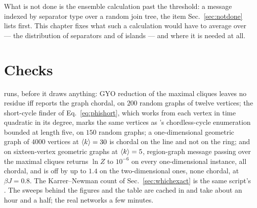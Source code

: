 What is not done is the ensemble calculation past the threshold: a message
indexed by separator type over a random join tree, the item
Sec.~\ref{sec:notdone} lists first. This chapter fixes what such a
calculation would have to average over --- the distribution of separators
and of islands --- and where it is needed at all.

\section{Checks}
\label{sec:exactness-checks}

 runs, before it draws
anything: GYO reduction of the maximal cliques leaves no residue iff
 reports the graph chordal, on $200$ random graphs of twelve
vertices; the short-cycle finder of Eq.~\eqref{eq:phishort}, which works
from each vertex in time quadratic in its degree, marks the same vertices as
's chordless-cycle enumeration bounded at length five, on
$150$ random graphs; a one-dimensional geometric graph of $4000$ vertices at
$\langle k \rangle=30$ is chordal on the line and not on the ring; and on
sixteen-vertex geometric graphs at $\langle k \rangle=5$, region-graph message passing
over the maximal cliques returns $\ln Z$ to $10^{-6}$ on every
one-dimensional instance, all chordal, and is off by up to $1.4$ on the
two-dimensional ones, none chordal, at $\beta J=0.8$. The Karrer--Newman
count of Sec.~\ref{sec:whichexact} is the same script's
. The sweeps behind the
figures and the table are cached in  and take about an hour and a half; the real
networks a few minutes.
